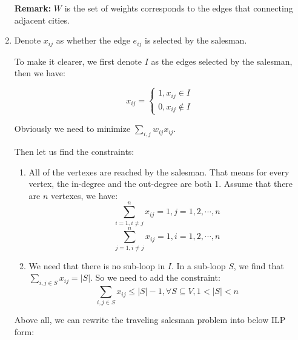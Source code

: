 \documentclass[12pt,a4paper]{article}
\makeatletter
\newtheorem*{solution}{Solution}
\theoremstyle{definition}
\renewenvironment{solution}[1][Solution] {\par\pushQED{\qed}\normalfont\topsep6\p@\@plus6\p@\relax\trivlist\item[\hskip\labelsep\bfseries#1\@addpunct{.}]\ignorespaces}{\popQED\endtrivlist\@endpefalse} \makeatother
\makeatother
\begin{document}
\begin{enumerate}
    \textbf{Remark:} $ W $ is the set of weights corresponds to the edges that connecting adjacent cities.  
    
    
    \begin{solution}
    
    Denote $x_{ij}$ as whether the edge $e_{ij}$ is selected by the salesman. 
    
    To make it clearer, we first denote $I$ as the edges selected by the salesman, then we have:
    
    $$ x_{ij}=\left\{
	\begin{aligned}
	1, x_{ij} \in I\\
	0, x_{ij} \notin I
	\end{aligned}
	\right.
	$$
	
	Obviously we need to minimize $\sum_{i,j}w_{ij}x_{ij}$.
	
	Then let us find the constraints:
	
	\begin{enumerate}
	\item All of the vertexes are reached by the salesman. That means for every vertex, the in-degree and the out-degree are both 1. Assume that there are $n$ vertexes, we have:
	$$\sum^{n}_{i=1,i \neq j} x_{ij} = 1, j = 1,2,\cdots,n$$
	$$\sum^{n}_{j=1,i \neq j} x_{ij} = 1, i = 1,2,\cdots,n$$
	\item We need that there is no sub-loop in $I$. In a sub-loop $S$, we find that $\sum_{i,j \in S} x_{ij} = |S|$. So we need to add the  constraint:
	$$\sum_{i,j \in S} x_{ij} \leqslant |S| - 1, \forall S \subseteq V, 1 < |S| < n$$
	\end{enumerate}
	
	Above all, we can rewrite the traveling salesman problem into below ILP form:
	

\end{solution}
\end{enumerate}
\end{document}

